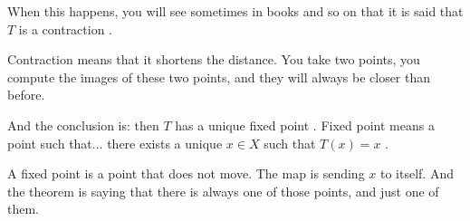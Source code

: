 \begin{speech}[00:20:15 - 00:21:58]
When this happens, you will see sometimes in books and so on that it is said that $T$ is a contraction .

Contraction means that it shortens the distance. You take two points, you compute the images of these two points, and they will always be closer than before.

And the conclusion is: then $T$ has a unique fixed point . Fixed point means a point such that... there exists a unique $x \in X$ such that $T(x) = x$ .

A fixed point is a point that does not move. The map is sending $x$ to itself. And the theorem is saying that there is always one of those points, and just one of them. 
\end{speech}

